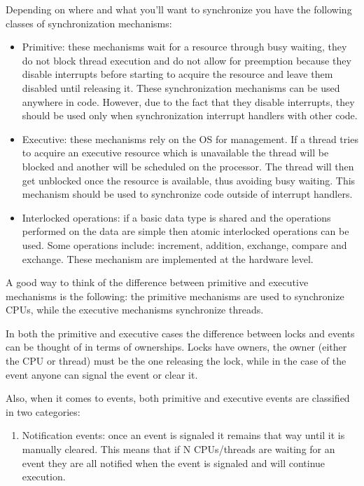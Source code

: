 \begin{appendices}
Depending on where and what you'll want to synchronize you have the following classes of
synchronization mechanisms:
\begin{itemize}
	\item Primitive: these mechanisms wait for a resource through busy waiting, they do not block
thread execution and do not allow for preemption because they disable interrupts before starting to
acquire the resource and leave them disabled until releasing it. These synchronization mechanisms
can be used anywhere in code. However, due to the fact that they disable interrupts, they should
be used only when synchronization interrupt handlers with other code.

	\item Executive: these mechanisms rely on the OS for management. If a thread tries to acquire
an executive resource which is unavailable the thread will be blocked and another will be scheduled
on the processor. The thread will then get unblocked once the resource is available, thus avoiding
busy waiting. This mechanism should be used to synchronize code outside of interrupt handlers.

	\item Interlocked operations: if a basic data type is shared and the operations performed on the
data are simple then atomic interlocked operations can be used. Some operations include: increment,
addition, exchange, compare and exchange. These mechanism are implemented at the hardware level.
\end{itemize}

A good way to think of the difference between primitive and executive mechanisms is the following:
the primitive mechanisms are used to synchronize CPUs, while the executive mechanisms synchronize
threads.

In both the primitive and executive cases the difference between locks and events can be thought of
in terms of ownerships. Locks have owners, the owner (either the CPU or thread) must be the one
releasing the lock, while in the case of the event anyone can signal the event or clear it.

Also, when it comes to events, both primitive and executive events are classified in two categories:
\begin{enumerate}
	\item Notification events: once an event is signaled it remains that way until it is manually
cleared. This means that if N CPUs/threads are waiting for an event they are all notified when the
event is signaled and will continue execution.


\end{enumerate}
\end{appendices}
